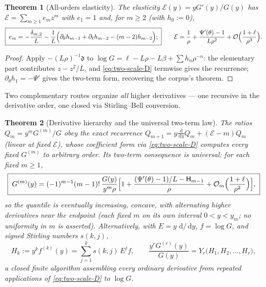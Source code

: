 \documentclass[11pt,oneside]{article}
\numberwithin{equation}{section}
\newtheorem{theorem}{Theorem}[section]
\theoremstyle{definition}
\theoremstyle{remark}
\newcommand{\dd}{\,\mathrm d}
\newcommand{\bigO}{\mathcal O}
\newcommand{\Bell}{Y}
\newcommand{\Hnum}{\mathsf H}
\begin{document}
\begin{theorem}[All-orders elasticity]
\label{thm:elasticity}
The elasticity
$\mathcal E(y)=yG'(y)/G(y)$ has
$\mathcal E=\sum_{m\ge1}e_mz^{m}$ with $e_1=1$ and, for $m\ge2$
(with $h_0:=0$),
\begin{equation}
 \boxed{\;
 e_m=-\frac{\delta_{m,2}}{L}
 -\frac1L\Bigl(
 \partial_\theta h_{m-1}
 +\partial_\ell h_{m-2}-(m-2)h_{m-2}
 \Bigr);
 \;}
 \qquad
 \mathcal E
 =\frac1\rho+\frac{\Psi'(\theta)-1}{L\rho^{2}}
 +\bigO\Bigl(\frac{1+\ell}{\rho^{3}}\Bigr).
 \label{eq:elasticity}
\end{equation}
\end{theorem}

\begin{proof}
Apply $-(L\rho)^{-1}\mathfrak d$ to
$\log G=\ell-L\rho-L\beta+\sum h_n\rho^{-n}$: the elementary part
contributes $z-z^{2}/L$, and \eqref{eq:two-scale-D} termwise gives
the recurrence; $\partial_\theta h_1=-\Psi'$ gives the two-term
form, recovering the corpus's theorem.
\end{proof}

Two complementary routes organize \emph{all} higher derivatives ---
one recursive in the derivative order, one closed via Stirling--Bell
conversion.

\begin{theorem}[Derivative hierarchy and the universal two-term law]
\label{thm:derivative-hierarchy}
The ratios $Q_m=y^{m}G^{(m)}/G$ obey the exact recurrence
$Q_{m+1}=y\tfrac{\dd}{\dd y}Q_m+(\mathcal E-m)Q_m$ (linear at fixed
$\mathcal E$), whose coefficient form via
\eqref{eq:two-scale-D} computes every fixed $G^{(m)}$ to arbitrary
order.  Its two-term consequence is universal: for each fixed
$m\ge1$,
\begin{equation}
 \boxed{\;
 G^{(m)}(y)=(-1)^{m-1}(m-1)!\,
 \frac{G(y)}{y^{m}\rho}
 \Bigl[1+\frac{(\Psi'(\theta)-1)/L-\Hnum_{m-1}}{\rho}
 +\bigO_m\Bigl(\frac{1+\ell}{\rho^{2}}\Bigr)\Bigr],
 \;}
 \label{eq:two-term-derivative}
\end{equation}
so the quantile is eventually increasing, concave, with alternating
higher derivatives near the endpoint (each fixed $m$ on its own
interval $0<y<y_m$; no uniformity in $m$ is asserted).
Alternatively, with $E=y\,\dd/\dd y$, $f=\log G$, and signed
Stirling numbers $s(k,j)$,
\begin{equation}
 H_k:=y^{k}f^{(k)}(y)=\sum_{j=1}^{k}s(k,j)\,E^{j}f,
 \qquad
 \frac{y^{r}G^{(r)}(y)}{G(y)}
 =\Bell_r\bigl(H_1,H_2,\dots,H_r\bigr),
 \label{eq:stirling-bell}
\end{equation}
a closed finite algorithm assembling every ordinary derivative from
repeated applications of \eqref{eq:two-scale-D} to $\log G$.
\end{theorem}
\end{document}
